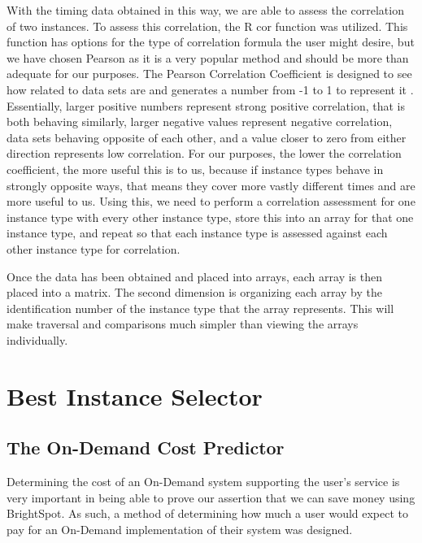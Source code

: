 \documentclass[thesis,proposal]{umassthesis}  %
\begin{document}
With the timing data obtained in this way, we are able to assess the correlation of two instances. To assess this correlation, the R cor function was utilized. This function has options for the type of correlation formula the user might desire, but we have chosen Pearson as it is a very popular method and should be more than adequate for our purposes. The Pearson Correlation Coefficient is designed to see how related to data sets are and  generates a number from -1 to 1 to represent it \cite{pearsonCoeff}. Essentially, larger positive numbers represent strong positive correlation, that is both behaving similarly, larger negative values represent negative correlation, data sets behaving opposite of each other, and a value closer to zero from either direction represents low correlation. For our purposes, the lower the correlation coefficient, the more useful this is to us, because if instance types behave in strongly opposite ways, that means they cover more vastly different times and are more useful to us. Using this, we need to perform a correlation assessment for one instance type with every other instance type, store this into an array for that one instance type, and repeat so that each instance type is assessed against each other instance type for correlation.\par


Once the data has been obtained and placed into arrays, each array is then placed into a matrix. The second dimension is organizing each array by the identification number of the instance type that the array represents. This will make traversal and comparisons much simpler than viewing the arrays individually.\par
 

\section{Best Instance Selector}
\subsection{The On-Demand Cost Predictor}

Determining the cost of an On-Demand system supporting the user's service is very important in being able to prove our assertion that we can save money using BrightSpot. As such, a method of determining how much a user would expect to pay for an On-Demand implementation of their system was designed.\par
\end{document}
